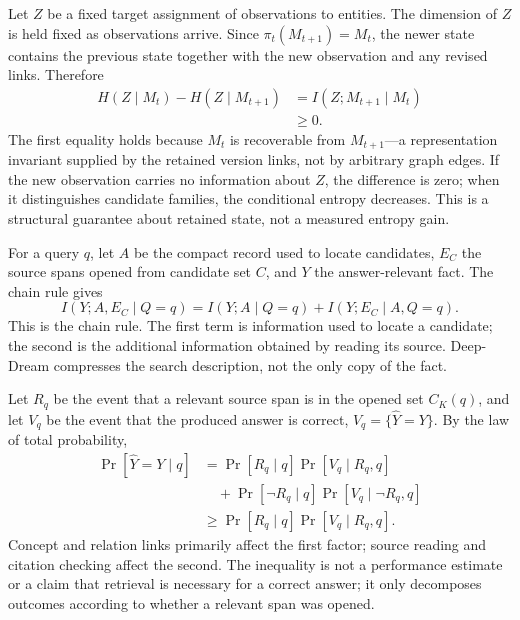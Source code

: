 Let $Z$ be a fixed target assignment of observations to entities. The dimension of $Z$ is held fixed as observations arrive. Since $\pi_t(M_{t+1})=M_t$, the newer state contains the previous state together with the new observation and any revised links. Therefore
\begin{equation}
\begin{aligned}
H(Z\mid M_t)-H(Z\mid M_{t+1})
&=I(Z;M_{t+1}\mid M_t)\\
&\ge 0.
\end{aligned}
\label{eq:state-uncertainty}
\end{equation}
The first equality holds because $M_t$ is recoverable from $M_{t+1}$---a representation invariant supplied by the retained version links, not by arbitrary graph edges. If the new observation carries no information about $Z$, the difference is zero; when it distinguishes candidate families, the conditional entropy decreases. This is a structural guarantee about retained state, not a measured entropy gain.

For a query $q$, let $A$ be the compact record used to locate candidates, $E_C$ the source spans opened from candidate set $C$, and $Y$ the answer-relevant fact. The chain rule gives
\begin{equation}
I(Y;A,E_C\mid Q=q)=I(Y;A\mid Q=q)+I(Y;E_C\mid A,Q=q).
\label{eq:two-rate-code}
\end{equation}
This is the chain rule. The first term is information used to locate a candidate; the second is the additional information obtained by reading its source. Deep-Dream compresses the search description, not the only copy of the fact.

Let $R_q$ be the event that a relevant source span is in the opened set $C_K(q)$, and let $V_q$ be the event that the produced answer is correct, $V_q=\{\widehat Y=Y\}$. By the law of total probability,
\begin{equation}
\begin{aligned}
\Pr[\widehat Y=Y\mid q]
&=\Pr[R_q\mid q]\Pr[V_q\mid R_q,q]\\
&\quad+\Pr[\neg R_q\mid q]\Pr[V_q\mid\neg R_q,q]\\
&\ge \Pr[R_q\mid q]\Pr[V_q\mid R_q,q].
\end{aligned}
\label{eq:answer-decomposition}
\end{equation}
Concept and relation links primarily affect the first factor; source reading and citation checking affect the second. The inequality is not a performance estimate or a claim that retrieval is necessary for a correct answer; it only decomposes outcomes according to whether a relevant span was opened.
